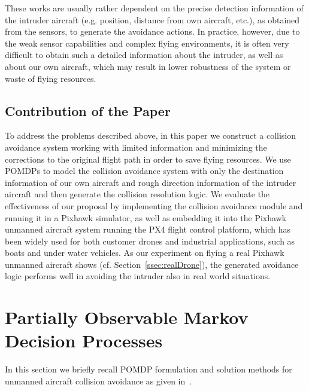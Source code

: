 \documentclass[orivec]{llncs}
\begin{document}
These works are usually rather dependent on the precise detection information of the intruder aircraft (e.g. position, distance from own aircraft, etc.), as obtained from the sensors, to generate the avoidance actions.
In practice, however, due to the weak sensor capabilities and complex flying environments, it is often very difficult to obtain such a detailed information about the intruder, as well as about our own aircraft, which may result in lower robustness of the system or waste of flying resources.


\subsection{Contribution of the Paper}
\label{ssec:intro:contribution}

To address the problems described above, in this paper we construct a collision avoidance system working with limited information and minimizing the corrections to the original flight path in order to save flying resources.
We use POMDPs to model the collision avoidance system with only the destination information of our own aircraft and rough direction information of the intruder aircraft and then generate the collision resolution logic.
We evaluate the effectiveness of our proposal by implementing the collision avoidance module and running it in a Pixhawk simulator, as well as embedding it into the Pixhawk unmanned aircraft system running the PX4 flight control platform, which has been widely used for both customer drones and industrial applications, such as boats and under water vehicles.
As our experiment on flying a real Pixhawk unmanned aircraft shows (cf. Section~\ref{ssec:realDrone}), the generated avoidance logic performs well in avoiding the intruder also in real world situations.


\section{Partially Observable Markov Decision Processes}
\label{sec:MDPsandPOMDPs}

In this section we briefly recall POMDP formulation and solution methods for unmanned aircraft collision avoidance as given in~\cite{DBLP:conf/rss/Bai-RSS-11}.
\end{document}
